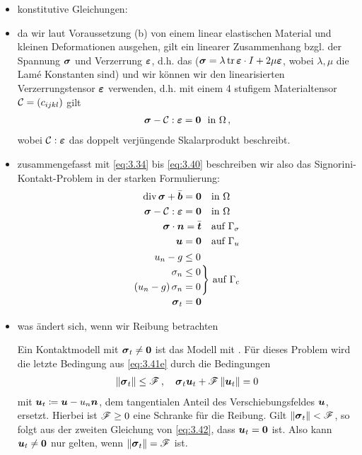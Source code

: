 \begin{itemize}
\item konstitutive Gleichungen:

\item da wir laut Voraussetzung (b) von einem linear elastischen Material und kleinen Deformationen ausgehen, gilt ein linearer Zusammenhang bzgl. der Spannung $\boldsymbol \sigma$ und Verzerrung $\boldsymbol {\varepsilon}$, d.h. das  ($\boldsymbol \sigma = \lambda \operatorname{tr} \boldsymbol {\varepsilon} \cdot  I + 2 \mu \boldsymbol {\varepsilon}$, wobei $\lambda, \mu$ die Lamé Konstanten sind) und wir können wir den linearisierten Verzerrungstensor $\boldsymbol {\varepsilon}$ verwenden, d.h. mit einem 4 stufigem Materialtensor $\mathcal C = (c_{ijkl})$ gilt
\begin{align}\label{eq:3.40}
	\boldsymbol \sigma - \mathcal C : \boldsymbol {\varepsilon} = \boldsymbol 0 \ \text{ in } \Omega \, ,
\end{align}
wobei $\mathcal C : \boldsymbol {\varepsilon}$ das doppelt verjüngende Skalarprodukt beschreibt.



\item zusammengefasst mit \eqref{eq:3.34} bis \eqref{eq:3.40} beschreiben wir also das Signorini-Kontakt-Problem in der starken Formulierung:
\begin{subequations}\label{eq:3.41}
\begin{align}\label{eq:3.41a}
	\operatorname{div} \boldsymbol \sigma + \bar{\boldsymbol b} = \boldsymbol 0&\ \ \text{ in } \Omega\\
	\label{eq:3.41b}
	\boldsymbol \sigma  - \mathcal C :\boldsymbol {\varepsilon}  = \boldsymbol 0&\ \ \text{ in } \Omega\\
	\label{eq:3.41c}
	\boldsymbol \sigma \cdot \boldsymbol n = \bar{\boldsymbol t} &\ \ \text{ auf } \Gamma_\sigma \\
	\label{eq:3.41d}
	\boldsymbol u = \boldsymbol 0 &\ \ \text{ auf }\Gamma_u \\
	\label{eq:3.41e}
	\begin{aligned}
		 u_n  - g& \le 0 \\
		\sigma_n &\le 0 \\
		(u_n  - g)\,  \sigma_n &= 0  \\
		\boldsymbol \sigma_t &= \boldsymbol 0
	\end{aligned}&\Bigg\}
\text{ auf } \Gamma_c 
\end{align}
\end{subequations}

\item was ändert sich, wenn wir Reibung betrachten
\begin{bem}
Ein Kontaktmodell mit $\boldsymbol \sigma_t \not = \boldsymbol 0$ ist das Modell mit \textit{}. Für dieses Problem wird die letzte Bedingung aus \eqref{eq:3.41e} durch die Bedingungen
\begin{align}\label{eq:3.42}
	\lVert \boldsymbol \sigma_t\rVert \le \mathscr F \, , \quad \boldsymbol \sigma_t \boldsymbol u_t + \mathscr F\,  \lVert \boldsymbol u_t\rVert = 0
\end{align}
mit $\boldsymbol u_t \coloneqq \boldsymbol u - u_n \boldsymbol n$, dem tangentialen Anteil des Verschiebungsfeldes $\boldsymbol u$, ersetzt. Hierbei ist $\mathscr F \ge 0$ eine Schranke für die Reibung. Gilt $\lVert \boldsymbol \sigma_t\rVert < \mathscr F$, so folgt aus der zweiten Gleichung von \eqref{eq:3.42}, dass $\boldsymbol u_t = \boldsymbol 0$ ist. Also kann $\boldsymbol u_t \not=\boldsymbol 0$ nur gelten, wenn $\lVert \boldsymbol \sigma_t\rVert = \mathscr F$ ist.


\end{bem}
\end{itemize}

